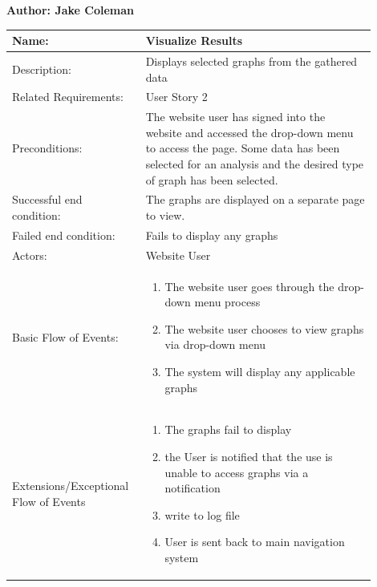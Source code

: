 \documentclass[11pt]{article}
\begin{document}
\begin{table}[!ht]
\begin{center}
\textbf{Author: Jake Coleman}
\vspace*{1em}

\begin{tabular}{p{0.30\linewidth}p{0.60\linewidth}}
	Name: & Visualize Results\\\hline
	Description: & Displays selected graphs from the gathered data\\\hline
	Related Requirements:& User Story 2\\\hline
	Preconditions:& The website user has signed into the website and accessed the drop-down menu to access the page. Some data has been selected for an analysis and the desired type of graph has been selected.\\\hline
	Successful end condition:& The graphs are displayed on a separate page to view.\\\hline
	Failed end condition:& Fails to display any graphs\\\hline
	Actors:& Website User\\\hline
	Basic Flow of Events: & \begin{enumerate}
	\item The website user goes through the drop-down menu process
	\item The website user chooses to view graphs via drop-down menu
	\item The system will display any applicable graphs
	\end{enumerate}\\\hline
	Extensions/Exceptional Flow of Events & \begin{enumerate}
	\item The graphs fail to display
	\item the User is notified that the use is unable to access graphs via a notification
	\item write to log file
	\item User is sent back to main navigation system
	\end{enumerate}
\end{tabular}
\label{des:vis_res}	
\end{center}
\end{table}
\end{document}
